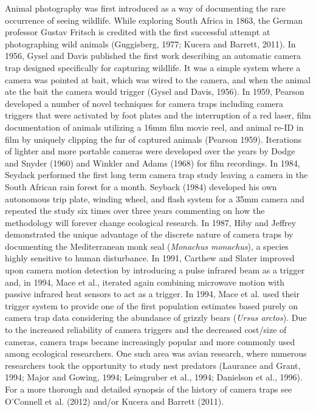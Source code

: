 \documentclass[11pt]{article}
\begin{document}
Animal photography was first introduced as a way of documenting the rare occurrence of seeing wildlife. While exploring South Africa in 1863, the German professor Gustav Fritsch is credited with the first successful attempt at photographing wild animals (Guggisberg, 1977; Kucera and Barrett, 2011). In 1956, Gysel and Davis published the first work describing an automatic camera trap designed specifically for capturing wildlife. It was a simple system where a camera was pointed at bait, which was wired to the camera, and when the animal ate the bait the camera would trigger (Gysel and Davis, 1956). In 1959, Pearson developed a number of novel techniques for camera traps including camera triggers that were activated by foot plates and the interruption of a red laser, film documentation of animals utilizing a 16mm film movie reel, and animal re-ID in film by uniquely clipping the fur of captured animals (Pearson 1959). Iterations of lighter and more portable cameras were developed over the years by Dodge and Snyder (1960) and Winkler and Adams (1968) for film recordings. In 1984, Seydack performed the first long term camera trap study leaving a camera in the South African rain forest for a month. Seyback (1984) developed his own autonomous trip plate, winding wheel, and flash system for a 35mm camera and repeated the study six times over three years commenting on how the methodology will forever change ecological research. In 1987, Hiby and Jeffrey demonstrated the unique advantage of the discrete nature of camera traps by documenting the Mediterranean monk seal (\textit{Monachus monachus}), a species highly sensitive to human disturbance. In 1991, Carthew and Slater improved upon camera motion detection by introducing a pulse infrared beam as a trigger and, in 1994, Mace et al., iterated again combining microwave motion with passive infrared heat sensors to act as a trigger. In 1994, Mace et al. used their trigger system to provide one of the first population estimates based purely on camera trap data considering the abundance of grizzly bears (\textit{Ursus arctos}). Due to the increased reliability of camera triggers and the decreased cost/size of cameras, camera traps became increasingly popular and more commonly used among ecological researchers. One such area was avian research, where numerous researchers took the opportunity to study nest predators (Laurance and Grant, 1994; Major and Gowing, 1994; Leimgruber et al., 1994; Danielson et al., 1996). For a more thorough and detailed synopsis of the history of camera traps see O'Connell et al. (2012) and/or Kucera and Barrett (2011). 
\end{document}
